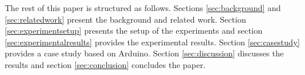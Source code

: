 The rest of this paper is structured as follows.  Sections \ref{sec:background} and \ref{sec:relatedwork} present the background and related work. Section \ref{sec:experimentsetup} presents the setup of the experiments and section \ref{sec:experimentalresults} provides the experimental results. Section \ref{sec:casestudy} provides a case study based on Arduino.  Section \ref{sec:discussion} discusses the results and section \ref{sec:conclusion} concludes the paper.    

